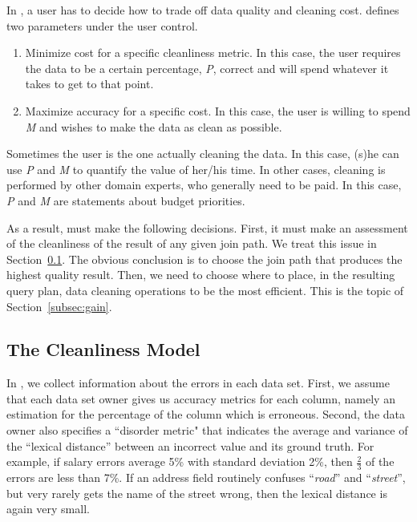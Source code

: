 In \dcv, a user has to decide how to trade off data quality and cleaning cost. 
\dcv defines two parameters under the user control.

\begin{enumerate}
\item Minimize cost for a specific cleanliness metric. In this case, the user requires the data to be a certain percentage, \emph{P}, correct and will spend whatever it takes to get to that point.

\item Maximize accuracy for a specific cost. In this case, the user is willing to spend \emph{M} and wishes to make the data as clean as possible.
\end{enumerate}


Sometimes the user is the one actually cleaning the data. In this case, (s)he can use \emph{P} and \emph{M} to quantify the value of her/his time. 
In other cases, cleaning is performed by other domain experts, who generally need to be paid. In this case, \emph{P} and \emph{M} are statements about budget priorities.



As a result, \dcv must make the following decisions.  First, it must make an assessment of the cleanliness of the result of any given join path.  We treat this issue in Section~\ref{subsec:model}. The obvious conclusion is to choose the join path that produces the highest quality result.
Then, we need to choose where to place,  in the resulting query plan, data cleaning operations to be the most efficient.  This is the topic of Section~\ref{subsec:gain}.


\subsection{The Cleanliness Model}
\label{subsec:model}

In \dcv, we collect information about the errors in each data set. 
First, we assume that each data set owner gives us accuracy metrics for each column, namely an estimation for the percentage of the column which is erroneous. 
Second, the data owner also specifies a ``disorder metric" that indicates the average and variance of the ``lexical distance'' between an incorrect value and its ground truth. 
For example, if salary errors average 5\% with standard deviation 2\%, then $\frac{2}{3}$  of the errors are less than 7\%. 
If an address field routinely confuses ``\textit{road}'' and ``\textit{street}'', but very rarely gets the name of the street wrong, then the lexical distance is again very small. 

